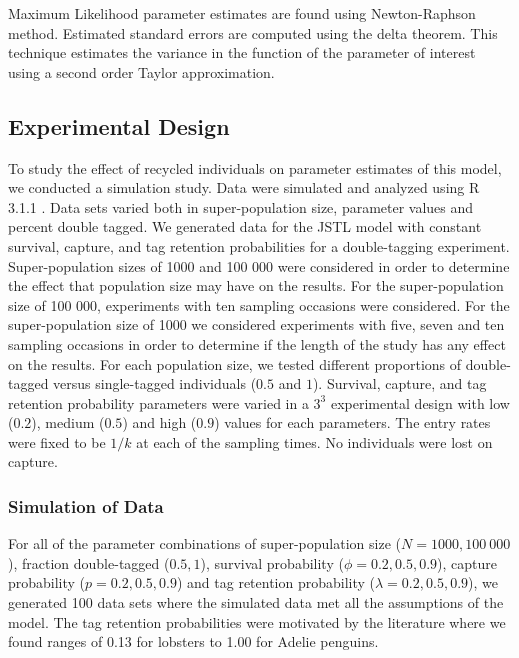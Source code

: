 \documentclass[]{article}
\begin{document}
Maximum Likelihood parameter estimates are found using Newton-Raphson
method. Estimated standard errors are computed using the delta theorem.
This technique estimates the variance in the function of the parameter
of interest using a second order Taylor approximation.

\subsection{Experimental Design}\label{experimental-design}

To study the effect of recycled individuals on parameter estimates of
this model, we conducted a simulation study. Data were simulated and
analyzed using R 3.1.1 \citep{R}. Data sets varied both in super-population size,
parameter values and percent double tagged. We generated data for the
JSTL model with constant survival, capture, and tag retention
probabilities for a double-tagging experiment. Super-population sizes of
1000 and 100 000 were considered in order to determine the effect that
population size may have on the results. For the super-population size
of 100 000, experiments with ten sampling occasions were considered. For
the super-population size of 1000 we considered experiments with five,
seven and ten sampling occasions in order to determine if the length of
the study has any effect on the results. For each population size, we
tested different proportions of double-tagged versus single-tagged
individuals (\(0.5\) and \(1\)). Survival, capture, and tag retention
probability parameters were varied in a \(3^3\) experimental design with
low (\(0.2\)), medium (\(0.5\)) and high (\(0.9\)) values for each
parameters. The entry rates were fixed to be $1/k$ at each of the
sampling times. No individuals were lost on capture.

\subsubsection{Simulation of Data}\label{simulation-of-data}

For all of the parameter combinations of super-population size
(\(N=1 000, 100 \ 000\)), fraction double-tagged (\(0.5, 1\)), survival
probability (\(\phi=0.2,0.5,0.9\)), capture probability
(\(p=0.2,0.5,0.9\)) and tag retention probability
(\(\lambda=0.2,0.5,0.9\)), we generated 100 data sets where the
simulated data met all the assumptions of the model. The tag retention probabilities were motivated by the literature where we found ranges of 0.13 \citep{Fogarty:1980} for lobsters to 1.00 \citep{Ainley:1980} for Adelie penguins.
\end{document}
